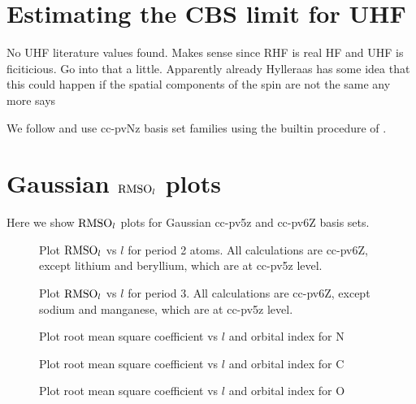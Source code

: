 \begin{appendix}
\chapter{Estimating the CBS limit for UHF}
\label{apx:CbsLimit}
No UHF literature values found.
Makes sense since RHF is real HF and UHF is ficiticious.
Go into that a little.
Apparently already Hylleraas\cite{Hylleraas1929} has some idea that this could
happen if the spatial components of the spin are not the same any more
says \cite{Mestechkin1981}


We follow \cite{Jensen2005} and use cc-pvNz basis set families
using the builtin procedure of \molsturm.

\chapter{Gaussian $\text{RMSO}_l$ plots}
\label{apx:GaussianUHF}

Here we show $\text{RMSO}_l$ plots for Gaussian cc-pv5z and cc-pv6Z basis sets.

\begin{figure}
	\centering
	\caption{Plot $\text{RMSO}_l$ vs $l$ for period 2 atoms. All calculations are cc-pv6Z,
	except lithium and beryllium, which are at cc-pv5z level.}
	\label{fig:RMSO_period2_l}
\end{figure}

\begin{figure}
	\centering
	\caption{Plot $\text{RMSO}_l$ vs $l$ for period 3. All calculations are cc-pv6Z,
	except sodium and manganese, which are at cc-pv5z level.}
	\label{fig:RMSO_period3_l}
\end{figure}

\begin{figure}
	\centering
	\caption{Plot root mean square coefficient vs $l$ and orbital index for N}
	\label{fig:RMSLF_N}
\end{figure}

\begin{figure}
	\centering
	\caption{Plot root mean square coefficient vs $l$ and orbital index for C}
	\label{fig:RMSLF_C}
\end{figure}

\begin{figure}
	\centering
	\caption{Plot root mean square coefficient vs $l$ and orbital index for O}
	\label{fig:RMSLF_O}
\end{figure}



\end{appendix}
